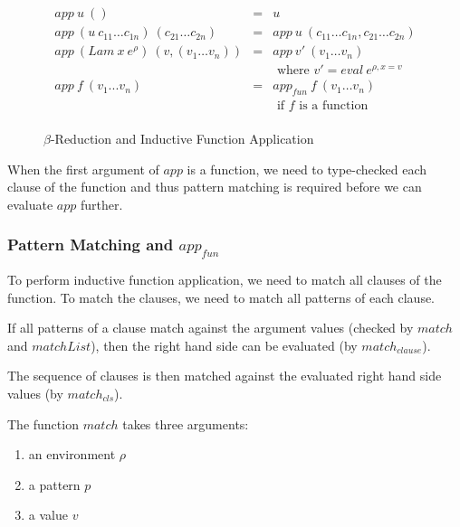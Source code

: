 \documentclass[acmsmall]{acmart}
\begin{document}
\begin{figure}[H]
  \begin{equation*}
    \begin{aligned}
      app \: u \: ()                                             & = & u                                                      \\
      app \: (u \: c_{11} \dots c_{1n}) \: (c_{21} \dots c_{2n}) & = & app \: u \: (c_{11} \dots c_{1n}, c_{21} \dots c_{2n}) \\
      app \: (Lam \: x \: e^{\rho}) \: (v,(v_1 \dots v_n))       & = & app \: v' \: (v_1 \dots v_n)                           \\
                                                                 &   & \textrm{ where } v' = eval \: e^{\rho,x=v}             \\
      app \: f \: (v_1 ... v_n)                                  & = & app_{fun} \: f \: (v_1 \dots v_n)                      \\
                                                                 &   & \textrm{ if } f \textrm{ is a function }               \\
    \end{aligned}
  \end{equation*}
  \caption{$\beta$-Reduction and Inductive Function Application}
\end{figure}

When the first argument of $app$ is a function, we need to type-checked each
clause of the function and thus pattern matching is required before we can evaluate $app$ further.

\subsubsection{Pattern Matching and $app_{fun}$}

To perform inductive function application, we need to match all clauses
of the function. To match the clauses, we need to match all patterns of
each clause. 

If all patterns of a clause match against the argument values (checked by $match$ and $matchList$), then
the right hand side can be evaluated (by $match_{clause}$). 

The sequence of clauses is then matched against the evaluated right hand side values (by $match_{cls}$).

The function $match$ takes three arguments:

\begin{enumerate}
  \item an environment $\rho$
  \item a pattern $p$
  \item a value $v$
\end{enumerate}
\end{document}
